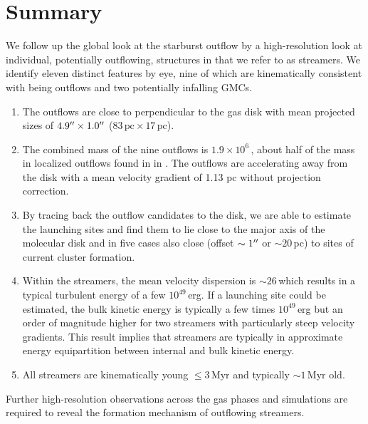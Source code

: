 

\section{Summary}

We follow up the global look at the  starburst outflow by a high-resolution look at individual, potentially outflowing, structures in  that we refer to as streamers.
We identify eleven distinct features by eye, nine of which are kinematically consistent with being outflows and two potentially infalling GMCs.

\begin{enumerate}[noitemsep,topsep=0pt]

\item The outflows are close to perpendicular to the gas disk with mean projected sizes of $4.9^{\prime\prime} \times 1.0^{\prime\prime}$ ($83\,\mathrm{pc} \times 17\,\mathrm{pc}$).

\item The combined mass of the nine outflows is $1.9 \times 10^6$\,\Msun, about half of the mass in localized outflows found in  in \citet[, Chapter~\ref{chapter: outflow}]{2019ApJ...881...43K}.
The outflows are accelerating away from the disk with a mean velocity gradient of 1.13\,\kms\,pc without projection correction.

\item By tracing back the outflow candidates to the disk, we are able to estimate the launching sites and find them to lie close to the major axis of the molecular disk and in five cases also close (offset $\sim 1^{\prime\prime}$ or $\sim 20$\,pc) to sites of current cluster formation.

\item Within the streamers, the mean velocity dispersion is $\sim 26$\,\kms which results in a typical turbulent energy of a few $10^{49}$\,erg.
If a launching site could be estimated, the bulk kinetic energy is typically a few times $10^{49}$\,erg but an order of magnitude higher for two streamers with particularly steep velocity gradients.
This result implies that streamers are typically in approximate energy equipartition between internal and bulk kinetic energy.

\item All streamers are kinematically young $\leq 3$\,Myr and typically $\sim 1$\,Myr old.

\end{enumerate}

Further high-resolution observations across the gas phases and simulations are required to reveal the formation mechanism of outflowing streamers.